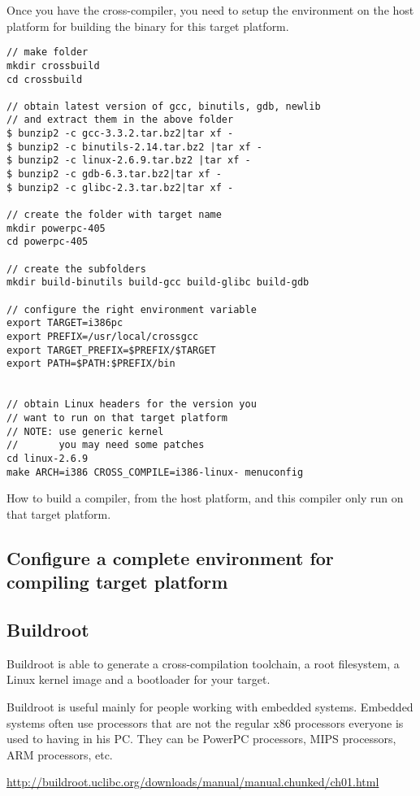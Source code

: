 Once you have the cross-compiler, you need to setup the environment 
on the host platform for building the binary for this target platform.

\begin{verbatim}
// make folder
mkdir crossbuild
cd crossbuild

// obtain latest version of gcc, binutils, gdb, newlib
// and extract them in the above folder
$ bunzip2 -c gcc-3.3.2.tar.bz2|tar xf -
$ bunzip2 -c binutils-2.14.tar.bz2 |tar xf -
$ bunzip2 -c linux-2.6.9.tar.bz2 |tar xf -
$ bunzip2 -c gdb-6.3.tar.bz2|tar xf -
$ bunzip2 -c glibc-2.3.tar.bz2|tar xf -

// create the folder with target name
mkdir powerpc-405
cd powerpc-405

// create the subfolders
mkdir build-binutils build-gcc build-glibc build-gdb

// configure the right environment variable
export TARGET=i386pc
export PREFIX=/usr/local/crossgcc
export TARGET_PREFIX=$PREFIX/$TARGET
export PATH=$PATH:$PREFIX/bin


// obtain Linux headers for the version you 
// want to run on that target platform
// NOTE: use generic kernel
//       you may need some patches
cd linux-2.6.9
make ARCH=i386 CROSS_COMPILE=i386-linux- menuconfig
\end{verbatim}


How to build a compiler, from the host platform, and this compiler
only run on that target platform.

\subsection{Configure a complete environment for compiling target platform}

\subsection{Buildroot}
\label{sec:Buildroot}

Buildroot is able to generate a cross-compilation toolchain, a root filesystem,
a Linux kernel image and a bootloader for your target.

Buildroot is useful mainly for people working with embedded systems. Embedded
systems often use processors that are not the regular x86 processors everyone is
used to having in his PC. They can be PowerPC processors, MIPS processors, ARM
processors, etc.

\url{http://buildroot.uclibc.org/downloads/manual/manual.chunked/ch01.html}

